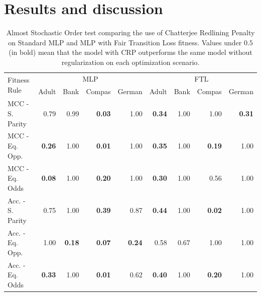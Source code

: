 \section{Results and discussion}


\begin{table}[ht]
\centering
\caption{Almost Stochastic Order test comparing the use of Chatterjee Redlining Penalty on Standard MLP and MLP with Fair Transition Loss fitness. Values under $0.5$ (in bold) mean that the model with CRP outperforms the same model without regularization on each optimization scenario.} \label{tab:aso_compare_crp}
{\footnotesize
\begin{tabular}{lrrrr|rrrr}
\toprule
\multirow{2}{*}{Fitness Rule} & \multicolumn{4}{c}{MLP} & \multicolumn{4}{c}{FTL} \\
& Adult & Bank & Compas & German & Adult & Bank & Compas & German \\
\midrule
MCC - S. Parity & 0.79 & 0.99 & \textbf{0.03} & 1.00 & \textbf{0.34} & 1.00 & 1.00 & \textbf{0.31} \\
MCC - Eq. Opp. & \textbf{0.26} & 1.00 & \textbf{0.01} & 1.00 & \textbf{0.35} & 1.00 & \textbf{0.19} & 1.00 \\
MCC - Eq. Odds & \textbf{0.08} & 1.00 & \textbf{0.20} & 1.00 & \textbf{0.30} & 1.00 & 0.56 & 1.00 \\
Acc. - S. Parity & 0.75 & 1.00 & \textbf{0.39} & 0.87 & \textbf{0.44} & 1.00 & \textbf{0.02} & 1.00 \\
Acc. - Eq. Opp. & 1.00 & \textbf{0.18} & \textbf{0.07} & \textbf{0.24} & 0.58 & 0.67 & 1.00 & 1.00 \\
Acc. - Eq. Odds & \textbf{0.33} & 1.00 & \textbf{0.01} & 0.62 & \textbf{0.40} & 1.00 & \textbf{0.20} & 1.00 \\
\bottomrule
\end{tabular}
}
\end{table}


